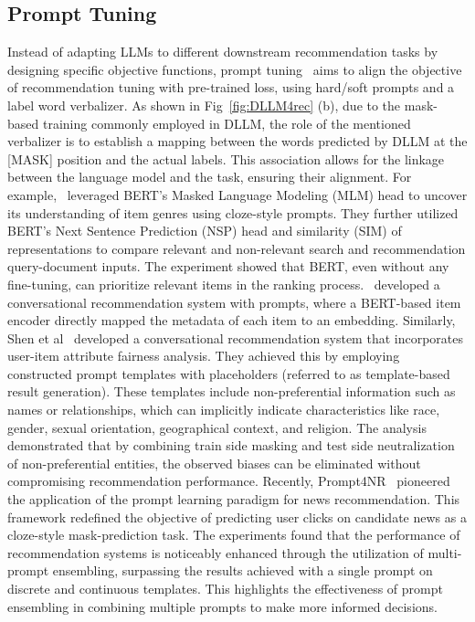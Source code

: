 \documentclass[sn-mathphys-num]{sn-jnl}%
\theoremstyle{thmstyleone}%
\theoremstyle{thmstyletwo}%
\theoremstyle{thmstylethree}%
\begin{document}
\subsection{Prompt Tuning}
Instead of adapting LLMs to different downstream recommendation tasks by designing specific objective functions, prompt tuning~\cite{lester2021power} aims to align the objective of recommendation tuning with pre-trained loss, using hard/soft prompts and a label word verbalizer. As shown in Fig~\ref{fig:DLLM4rec} (b), due to the mask-based training commonly employed in DLLM, the role of the mentioned verbalizer is to establish a mapping between the words predicted by DLLM at the [MASK] position and the actual labels. This association allows for the linkage between the language model and the task, ensuring their alignment.
For example,~\cite{penha2020does} leveraged BERT's Masked Language Modeling (MLM) head to uncover its understanding of item genres using cloze-style prompts. They further utilized BERT's Next Sentence Prediction (NSP) head and similarity (SIM) of representations to compare relevant and non-relevant search and recommendation query-document inputs. The experiment showed that BERT, even without any fine-tuning, can prioritize relevant items in the ranking process.~\cite{yang2022improving} developed a conversational recommendation system with prompts, where a BERT-based item encoder directly mapped the metadata of each item to an embedding. Similarly, Shen et al~\cite{shen2023towards} developed a conversational recommendation system that incorporates user-item attribute fairness analysis. They achieved this by employing constructed prompt templates with placeholders (referred to as template-based result generation). These templates include non-preferential information such as names or relationships, which can implicitly indicate characteristics like race, gender, sexual orientation, geographical context, and religion. The analysis demonstrated that by combining train side masking and test side neutralization of non-preferential entities, the observed biases can be eliminated without compromising recommendation performance.  Recently, Prompt4NR~\cite{zhang2023prompt} pioneered the application of the prompt learning paradigm for news recommendation. This framework redefined the objective of predicting user clicks on candidate news as a cloze-style mask-prediction task.
The experiments found that the performance of recommendation systems is noticeably enhanced through the utilization of multi-prompt ensembling, surpassing the results achieved with a single prompt on discrete and continuous templates. This highlights the effectiveness of prompt ensembling in combining multiple prompts to make more informed decisions.
\end{document}
